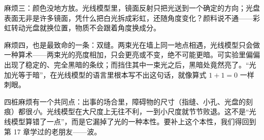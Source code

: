 麻烦三：颜色没地方放。光线模型里，镜面反射只把光送到一个确定的方向；光盘表面无非是许多镜面，凭什么把白光拆成彩虹，还随角度变化？颜料说不通——彩虹转动光盘就换位置，物质不会跟着角度换成分。

麻烦四，也是最致命的一条：双缝。两束光在墙上同一地点相遇，光线模型只会做一种算术——两束光的亮度相加，只会更亮或不变，绝不可能更暗。可实验里偏偏出现了稳定的、完全黑暗的条纹；而挡住其中一束光之后，黑暗处竟然亮了。“光加光等于暗”，在光线模型的语言里根本写不出这句话，就像算式 \(1+1=0\) 一样刺眼。

四桩麻烦有一个共同点：出事的场合里，障碍物的尺寸（指缝、小孔、光盘的刻痕）都很\emph{小}。光线模型在大尺度上无往不利，一到小尺度就节节败退。这不是“光线模型算错了一点”，而是它漏掉了光的一种本性。要补上这个本性，我们得回到第 17 章学过的老朋友——波。


